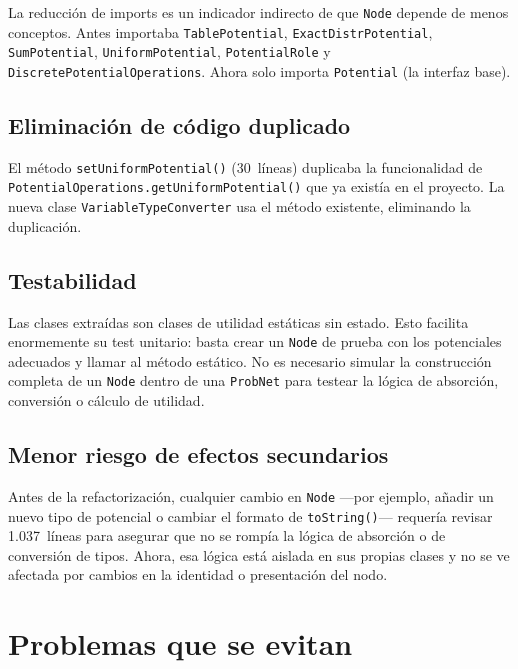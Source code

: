 \documentclass[11pt,a4paper]{article}
\newcommand{\code}[1]{\texttt{#1}}
\begin{document}
La reducci\'on de imports es un indicador indirecto de que \code{Node}
depende de menos conceptos.  Antes importaba \code{TablePotential},
\code{ExactDistrPotential}, \code{SumPotential},
\code{UniformPotential}, \code{PotentialRole} y
\code{DiscretePotentialOperations}.  Ahora solo importa
\code{Potential} (la interfaz base).

\subsection{Eliminaci\'on de c\'odigo duplicado}

El m\'etodo \code{setUniformPotential()} (30~l\'ineas) duplicaba la
funcionalidad de \code{PotentialOperations.getUniformPotential()} que
ya exist\'ia en el proyecto.  La nueva clase
\code{VariableTypeConverter} usa el m\'etodo existente, eliminando la
duplicaci\'on.

\subsection{Testabilidad}

Las clases extra\'idas son clases de utilidad est\'aticas sin estado.
Esto facilita enormemente su test unitario: basta crear un \code{Node}
de prueba con los potenciales adecuados y llamar al m\'etodo est\'atico.
No es necesario simular la construcci\'on completa de un \code{Node}
dentro de una \code{ProbNet} para testear la l\'ogica de absorci\'on,
conversi\'on o c\'alculo de utilidad.

\subsection{Menor riesgo de efectos secundarios}

Antes de la refactorizaci\'on, cualquier cambio en \code{Node} ---por
ejemplo, a\~nadir un nuevo tipo de potencial o cambiar el formato de
\code{toString()}--- requer\'ia revisar 1.037~l\'ineas para asegurar
que no se romp\'ia la l\'ogica de absorci\'on o de conversi\'on de
tipos.  Ahora, esa l\'ogica est\'a aislada en sus propias clases y no
se ve afectada por cambios en la identidad o presentaci\'on del nodo.

\section{Problemas que se evitan}
\label{sec:problemas}
\end{document}
